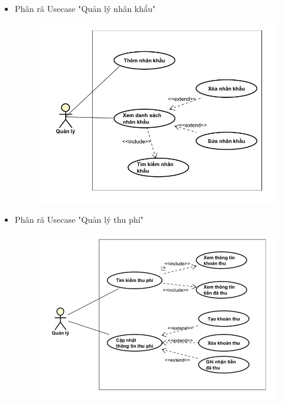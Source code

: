 \documentclass{article}
\begin{document}
\begin{itemize}
    \item Phân rã Usecase "Quản lý nhân khẩu"
    \begin{figure}[H]
        \centering
        \includegraphics{Ảnh chương 2/Nhân khẩu.jpg}
    \end{figure}
    
    \vspace{1cm}
    \item Phân rã Usecase "Quản lý thu phí"
    \begin{figure}[H]
        \centering
        \includegraphics{Ảnh chương 2/Khoản thu.jpg}
    \end{figure}
\end{itemize}
\end{document}
